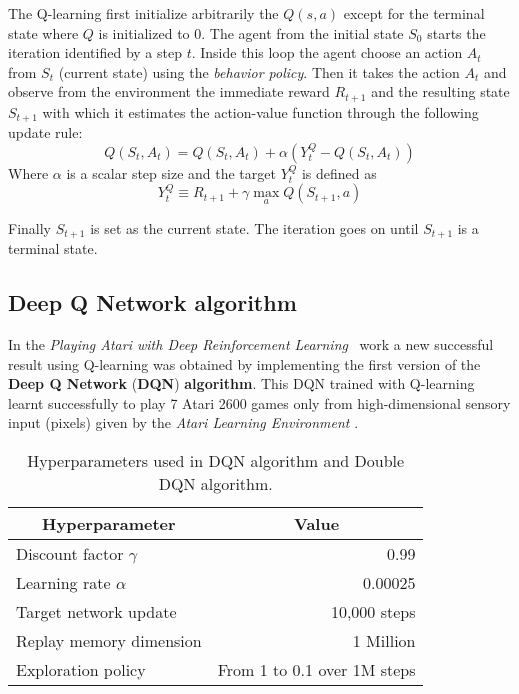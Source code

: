 The Q-learning first initialize arbitrarily the $Q(s,a)$ except for the terminal state where $Q$ is initialized to 0.
The agent from the initial state $S_0$ starts the iteration identified by a step $t$. Inside this loop the agent choose an action $A_t$ from $S_t$ (current state) using the \textit{behavior policy}. Then it takes the action $A_t$ and observe from the environment the immediate reward $R_{t+1}$ and the resulting state $S_{t+1}$ with which it estimates the action-value function through the following update rule:
\begin{equation}
	Q(S_t, A_t) = Q(S_t, A_t) + \alpha (Y^Q_t - Q(S_t, A_t))
\end{equation}
Where $\alpha$ is a scalar step size and the target $Y^Q_t$ is defined as
\begin{equation}
	Y^Q_t \equiv R_{t+1} + \gamma \max_{a} Q(S_{t+1}, a)
\end{equation}

Finally $S_{t+1}$ is set as the current state. The iteration goes on until $S_{t+1}$ is a terminal state.

\subsection{Deep Q Network algorithm}
\label{subsec:DQN}

In the \textit{Playing Atari with Deep Reinforcement Learning}~\cite{DBLP:journals/corr/MnihKSGAWR13} work a new successful result using Q-learning was obtained by implementing the first version of the \textbf{Deep Q Network} (\textbf{DQN}) \textbf{algorithm}. This DQN trained with Q-learning learnt successfully to play 7 Atari 2600 games only from high-dimensional sensory input (pixels) given by the \textit{Atari Learning Environment} \cite{ArcadeLearningEnvironment}.

\begin{table}[]
	\centering
	\begin{tabular}{|l|r|}
		\hline
		\multicolumn{1}{|c|}{\textbf{Hyperparameter}} &
		\multicolumn{1}{|c|}{\textbf{Value}}        \\
		\hline
		Discount factor $\gamma$ & 0.99                        \\
		Learning rate $\alpha$   & 0.00025                     \\
		Target network update    & 10,000 steps                \\
		Replay memory dimension  & 1 Million                   \\
		Exploration policy       & From 1 to 0.1 over 1M steps \\
		\hline
	\end{tabular}
	\caption{Hyperparameters used in DQN algorithm and Double DQN algorithm.}
	\label{fig:dqn-hyperparams}
\end{table}

